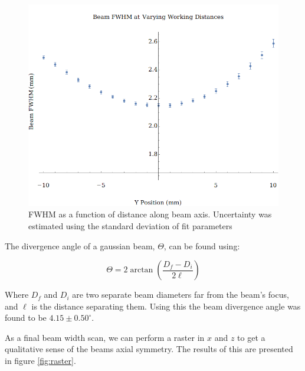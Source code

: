 \begin{figure}[h!]
    \centering
    \includegraphics[width=0.85\linewidth]{../Beam Divergence/Plots/FWHM plot.png}
	\caption{FWHM as a function of distance along beam axis. Uncertainty was estimated using the standard deviation of fit parameters}
    \label{fig:FWHM}
\end{figure}

The divergence angle of a gaussian beam, $\Theta$, can be found using:

\begin{equation}
	\Theta = 2\arctan\left(\frac{D_f - D_i}{2\ell}\right)
\end{equation}

Where $D_f$ and $D_i$ are two separate beam diameters far from the beam's focus, and $\ell$ is the distance separating them. Using this the beam 
divergence angle was found to be $4.15\pm0.50^\circ$. 

As a final beam width scan, we can perform a raster in $x$ and $z$ to get a qualitative sense of the beams axial symmetry. The results of this 
are presented in figure \ref{fig:raster}.

